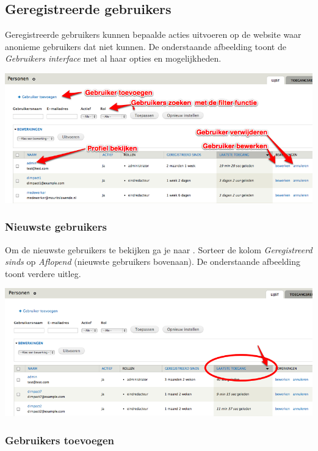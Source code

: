 \subsection{Geregistreerde gebruikers}\label{geregistreerdegebruikers}

Geregistreerde gebruikers kunnen bepaalde acties uitvoeren op de website waar anonieme gebruikers dat niet kunnen. 
De onderstaande afbeelding toont de \emph{Gebruikers interface} met al haar opties en mogelijkheden.

\begin{center}
	\includegraphics[width=\textwidth]{img/gebruikers1.png}
\end{center}

\subsubsection{Nieuwste gebruikers}

Om de nieuwste gebruikers te bekijken ga je naar . Sorteer de kolom \emph{Geregistreerd sinds} op \emph{Aflopend} (nieuwste gebruikers bovenaan). De onderstaande afbeelding toont verdere uitleg.

\begin{center}
	\includegraphics[width=\textwidth]{img/gebruikersnieuwste.png}
\end{center}

\subsubsection{Gebruikers toevoegen}

